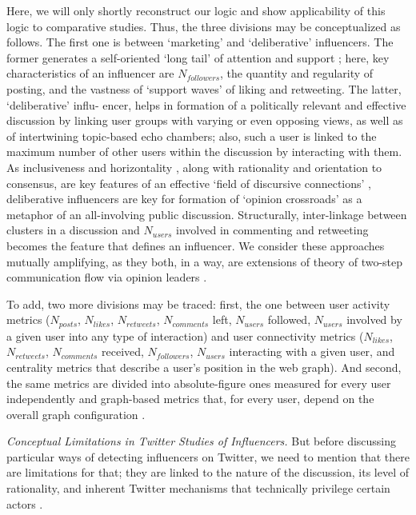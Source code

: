 Here, we will only shortly reconstruct our logic and show applicability of this logic to comparative studies. Thus, the three divisions may be conceptualized as follows. The first one is between ‘marketing’ and ‘deliberative’ influencers. The former generates a self-oriented ‘long tail’ of attention and support \cite[p.~1261]{DuboisGaffney} \cite{Aquino}; here, key characteristics of an influencer are \(N_{followers}\), the quantity and regularity of posting, and the vastness of ‘support waves’ of liking and retweeting. The latter, ‘deliberative’ influ- encer, helps in formation of a politically relevant and effective discussion by linking user groups with varying or even opposing views, as well as of intertwining topic-based echo chambers; also, such a user is linked to the maximum number of other users within the discussion by interacting with them. As inclusiveness and horizontality \cite{Papacharissi2010}, along with rationality and orientation to consensus, are key features of an effective ‘field of discursive connections’ \cite[p.~37]{Calhoun}, deliberative influencers are key for formation of ‘opinion crossroads’ \cite{BodrunovaLitvinenko,VanDeursenVanDijk} as a metaphor of an all-involving public discussion. Structurally, inter-linkage between clusters in a discussion and \(N_{users}\) involved in commenting and retweeting becomes the feature that defines an influencer. We consider these approaches mutually amplifying, as they both, in a way, are extensions of theory of two-step communication flow via opinion leaders \cite{Katz}.

To add, two more divisions may be traced: first, the one between user activity metrics (\(N_{posts}\), \(N_{likes}\), \(N_{retweets}\), \(N_{comments}\) left, \(N_{users}\) followed, \(N_{users}\) involved by a given user into any type of interaction) and user connectivity metrics (\(N_{likes}\), \(N_{retweets}\), \(N_{comments}\) received, \(N_{followers}\), \(N_{users}\) interacting with a given user, and centrality metrics that describe a user’s position in the web graph). And second, the same metrics are divided into absolute-figure ones measured for every user independently and graph-based metrics that, for every user, depend on the overall graph configuration \cite{BodrunovaLitvinenkoBlekanov2016}.

\textit{Conceptual Limitations in Twitter Studies of Influencers.} But before discussing particular ways of detecting influencers on Twitter, we need to mention that there are limitations for that; they are linked to the nature of the discussion, its level of rationality, and inherent Twitter mechanisms that technically privilege certain actors \cite{BodrunovaLitvinenkoBlekanov2016}.

